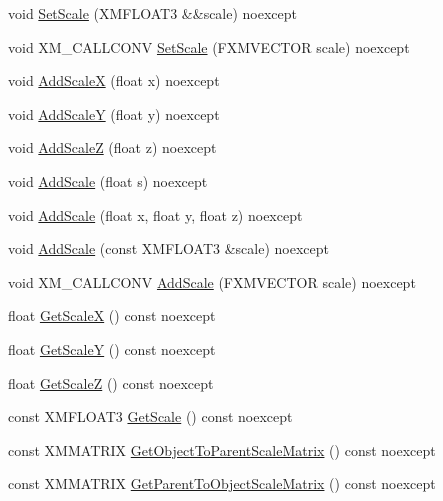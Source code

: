 \begin{DoxyCompactItemize}
\item 
void \hyperlink{structmage_1_1_transform_node_aaaa992bbd1ebad4b858fcb28ce2781d0}{Set\+Scale} (X\+M\+F\+L\+O\+A\+T3 \&\&scale) noexcept
\item 
void X\+M\+\_\+\+C\+A\+L\+L\+C\+O\+NV \hyperlink{structmage_1_1_transform_node_ad90daae6725ce76c43429ef5ab90c2da}{Set\+Scale} (F\+X\+M\+V\+E\+C\+T\+OR scale) noexcept
\item 
void \hyperlink{structmage_1_1_transform_node_a20741fcf5b135365dace95b360f735a7}{Add\+ScaleX} (float x) noexcept
\item 
void \hyperlink{structmage_1_1_transform_node_a71642412e9ef0654009ce9453af4ae48}{Add\+ScaleY} (float y) noexcept
\item 
void \hyperlink{structmage_1_1_transform_node_ab02378da7fe0ff878c200c6814e51937}{Add\+ScaleZ} (float z) noexcept
\item 
void \hyperlink{structmage_1_1_transform_node_ab548f51c982f7d40b28f328aa414b1dd}{Add\+Scale} (float s) noexcept
\item 
void \hyperlink{structmage_1_1_transform_node_a1e1f63f4d326e0db6fb976f817e31643}{Add\+Scale} (float x, float y, float z) noexcept
\item 
void \hyperlink{structmage_1_1_transform_node_a7ae8445a7f447ae832efafdfc20c3add}{Add\+Scale} (const X\+M\+F\+L\+O\+A\+T3 \&scale) noexcept
\item 
void X\+M\+\_\+\+C\+A\+L\+L\+C\+O\+NV \hyperlink{structmage_1_1_transform_node_ae8d3002804b23e5f8fcf4bd092869819}{Add\+Scale} (F\+X\+M\+V\+E\+C\+T\+OR scale) noexcept
\item 
float \hyperlink{structmage_1_1_transform_node_a88dcc4437775940b62854fb6d850a0a6}{Get\+ScaleX} () const noexcept
\item 
float \hyperlink{structmage_1_1_transform_node_a713993c5e55b27c31f63c7c88ed7dcea}{Get\+ScaleY} () const noexcept
\item 
float \hyperlink{structmage_1_1_transform_node_afbdb531f22a57dcf89d23beeddba4268}{Get\+ScaleZ} () const noexcept
\item 
const X\+M\+F\+L\+O\+A\+T3 \hyperlink{structmage_1_1_transform_node_a23109efb661cb17d3957286952334dc2}{Get\+Scale} () const noexcept
\item 
const X\+M\+M\+A\+T\+R\+IX \hyperlink{structmage_1_1_transform_node_a0abee6b9b77888cd5ca44060256a33c7}{Get\+Object\+To\+Parent\+Scale\+Matrix} () const noexcept
\item 
const X\+M\+M\+A\+T\+R\+IX \hyperlink{structmage_1_1_transform_node_adad8b644fdd549028bb86f97606e2798}{Get\+Parent\+To\+Object\+Scale\+Matrix} () const noexcept

\end{DoxyCompactItemize}
